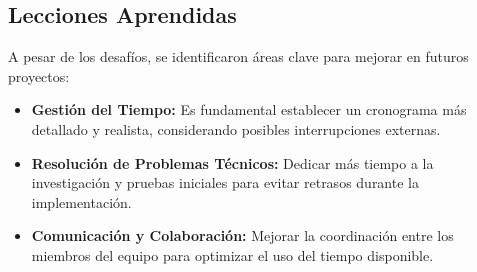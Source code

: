 \subsection{Lecciones Aprendidas}
A pesar de los desafíos, se identificaron áreas clave para mejorar en futuros proyectos:
\begin{itemize}
    \item \textbf{Gestión del Tiempo:} Es fundamental establecer un cronograma más detallado y realista, considerando posibles interrupciones externas.
    \item \textbf{Resolución de Problemas Técnicos:} Dedicar más tiempo a la investigación y pruebas iniciales para evitar retrasos durante la implementación.
    \item \textbf{Comunicación y Colaboración:} Mejorar la coordinación entre los miembros del equipo para optimizar el uso del tiempo disponible.
\end{itemize}